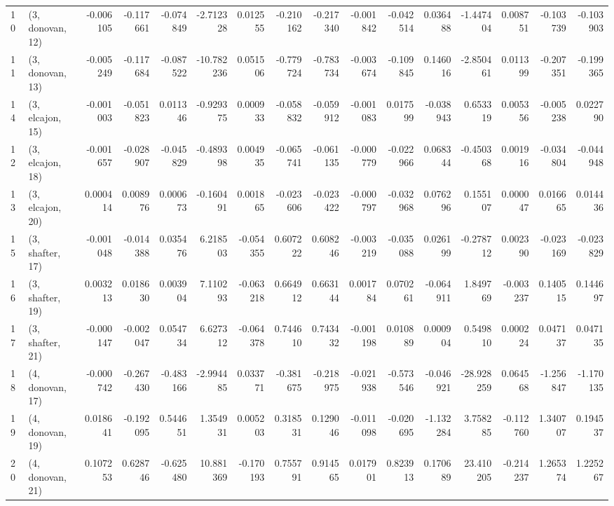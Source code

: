 \begin{tabular}{llrrrrrrrrrrrrrr}
10 &  (3, donovan, 12) &  -0.006105 & -0.117661 & -0.074849 &  -2.712328 &  0.012555 &  -0.210162 & -0.217340 & -0.001842 & -0.042514 &  0.036488 &  -1.447404 &  0.008751 & -0.103739 & -0.103903 \\
11 &  (3, donovan, 13) &  -0.005249 & -0.117684 & -0.087522 & -10.782236 &  0.051506 &  -0.779724 & -0.783734 & -0.003674 & -0.109845 &  0.146016 &  -2.850461 &  0.011399 & -0.207351 & -0.199365 \\
14 &  (3, elcajon, 15) &  -0.001003 & -0.051823 &  0.011346 &  -0.929375 &  0.000933 &  -0.058832 & -0.059912 & -0.001083 &  0.017599 & -0.038943 &   0.653319 &  0.005356 & -0.005238 &  0.022790 \\
12 &  (3, elcajon, 18) &  -0.001657 & -0.028907 & -0.045829 &  -0.489398 &  0.004935 &  -0.065741 & -0.061135 & -0.000779 & -0.022966 &  0.068344 &  -0.450368 &  0.001916 & -0.034804 & -0.044948 \\
13 &  (3, elcajon, 20) &   0.000414 &  0.008976 &  0.000673 &  -0.160491 &  0.001865 &  -0.023606 & -0.023422 & -0.000797 & -0.032968 &  0.076296 &   0.155107 &  0.000047 &  0.016665 &  0.014436 \\
15 &  (3, shafter, 17) &  -0.001048 & -0.014388 &  0.035476 &   6.218503 & -0.054355 &   0.607222 &  0.608246 & -0.003219 & -0.035088 &  0.026199 &  -0.278712 &  0.002390 & -0.023169 & -0.023829 \\
16 &  (3, shafter, 19) &   0.003213 &  0.018630 &  0.003904 &   7.110293 & -0.063218 &   0.664912 &  0.663144 &  0.001784 &  0.070261 & -0.064911 &   1.849769 & -0.003237 &  0.140515 &  0.144697 \\
17 &  (3, shafter, 21) &  -0.000147 & -0.002047 &  0.054734 &   6.627312 & -0.064378 &   0.744610 &  0.743432 & -0.001198 &  0.010889 &  0.000904 &   0.549810 &  0.000224 &  0.047137 &  0.047135 \\
18 &  (4, donovan, 17) &  -0.000742 & -0.267430 & -0.483166 &  -2.994485 &  0.033771 &  -0.381675 & -0.218975 & -0.021938 & -0.573546 & -0.046921 & -28.928259 &  0.064568 & -1.256847 & -1.170135 \\
19 &  (4, donovan, 19) &   0.018641 & -0.192095 &  0.544651 &   1.354931 &  0.005203 &   0.318531 &  0.129046 & -0.011098 & -0.020695 & -1.132284 &   3.758285 & -0.112760 &  1.340707 &  0.194537 \\
20 &  (4, donovan, 21) &   0.107253 &  0.628746 & -0.625480 &  10.881369 & -0.170193 &   0.755791 &  0.914565 &  0.017901 &  0.823913 &  0.170689 &  23.410205 & -0.214237 &  1.265374 &  1.225267 \\

\end{tabular}
